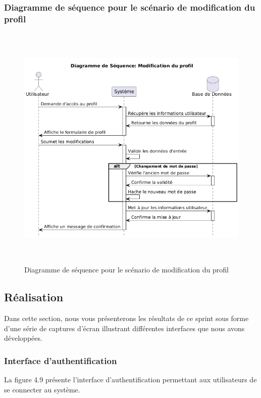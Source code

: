 \subsubsection{Diagramme de séquence pour le scénario de modification du profil}
\begin{figure}[H]
    \centering
    \includegraphics[width=13cm,height=12cm]{images/profilseq.png}
    \caption{Diagramme de séquence pour le scénario de modification du profil}
\end{figure}

\subsection{Réalisation}
\noindent Dans cette section, nous vous présenterons les résultats de ce sprint sous forme d'une série de captures d'écran illustrant différentes interfaces que nous avons développées.

\subsubsection{Interface d'authentification}
\noindent La figure 4.9 présente l'interface d'authentification permettant aux utilisateurs de se connecter au système.


